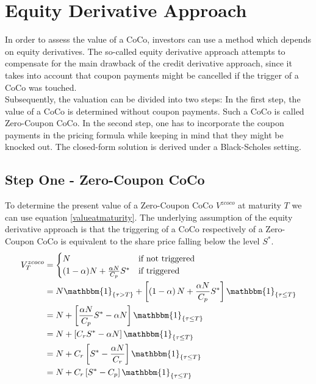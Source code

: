 \section{Equity Derivative Approach}

In order to assess the value of a CoCo, investors can use a method which depends on equity derivatives. \citep{de2011pricing, de2014handbook} The so-called equity derivative approach attempts to compensate for the main drawback of the credit derivative approach, since it takes into account that coupon payments might be cancelled if the trigger of a CoCo was touched.\\

Subsequently, the valuation can be divided into two steps: In the first step, the value of a CoCo is determined without coupon payments. Such a CoCo is called Zero-Coupon CoCo. In the second step, one has to incorporate the coupon payments in the pricing formula while keeping in mind that they might be knocked out. The closed-form solution is derived under a Black-Scholes setting.

\subsection{Step One - Zero-Coupon CoCo}

To determine the present value of a Zero-Coupon CoCo $V^{zcoco}$ at maturity $T$ we can use equation \ref{valueatmaturity}. The underlying assumption of the equity derivative approach is that the triggering of a CoCo respectively of a Zero-Coupon CoCo is equivalent to the share price falling below the level $S^*$. %
\begin{align} \label{pvedcoco}    
    V^{zcoco}_T &= \begin{cases} N & \text{if not triggered}\\ (1 - \alpha) N + \frac{\alpha N}{C_p} S^{*} & \text{if triggered} \end{cases} \nonumber\\
    &= N \mathbbm{1}_{\{ \tau > T \}} +\left[ \left( 1 - \alpha \right) N + \dfrac{\alpha N}{C_p } S^* \right] \mathbbm{1}_{\{ \tau \leq T \}}\nonumber\\
    &= N + \left[ \dfrac{\alpha N}{C_p} S^* - \alpha N \right] \mathbbm{1}_{\{ \tau \leq T \}}\nonumber\\
    &= N + \left[ C_r S^* - \alpha N \right] \mathbbm{1}_{\{ \tau \leq T \}}\nonumber\\
    &= N + C_r \left[S^* - \dfrac{\alpha N}{C_r}\right] \mathbbm{1}_{\{ \tau \leq T \}}\nonumber\\
    &= N + C_r \left[ S^* - C_p \right] \mathbbm{1}_{\{ \tau \leq T \}}
\end{align}

